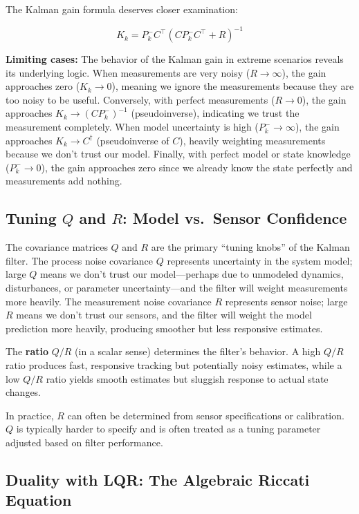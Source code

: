 The Kalman gain formula deserves closer examination:

\begin{equation}
K_k = P_k^- C^\top (CP_k^-C^\top + R)^{-1}
\end{equation}

\textbf{Limiting cases:} The behavior of the Kalman gain in extreme scenarios reveals its underlying logic. When measurements are very noisy ($R \to \infty$), the gain approaches zero ($K_k \to 0$), meaning we ignore the measurements because they are too noisy to be useful. Conversely, with perfect measurements ($R \to 0$), the gain approaches $K_k \to (CP_k^-)^{-1}$ (pseudoinverse), indicating we trust the measurement completely. When model uncertainty is high ($P_k^- \to \infty$), the gain approaches $K_k \to C^\dagger$ (pseudoinverse of $C$), heavily weighting measurements because we don't trust our model. Finally, with perfect model or state knowledge ($P_k^- \to 0$), the gain approaches zero since we already know the state perfectly and measurements add nothing.

\subsection{Tuning $Q$ and $R$: Model vs.\ Sensor Confidence}

The covariance matrices $Q$ and $R$ are the primary ``tuning knobs'' of the Kalman filter. The process noise covariance $Q$ represents uncertainty in the system model; large $Q$ means we don't trust our model---perhaps due to unmodeled dynamics, disturbances, or parameter uncertainty---and the filter will weight measurements more heavily. The measurement noise covariance $R$ represents sensor noise; large $R$ means we don't trust our sensors, and the filter will weight the model prediction more heavily, producing smoother but less responsive estimates.

The \textbf{ratio} $Q/R$ (in a scalar sense) determines the filter's behavior. A high $Q/R$ ratio produces fast, responsive tracking but potentially noisy estimates, while a low $Q/R$ ratio yields smooth estimates but sluggish response to actual state changes.

In practice, $R$ can often be determined from sensor specifications or calibration. $Q$ is typically harder to specify and is often treated as a tuning parameter adjusted based on filter performance.

\subsection{Duality with LQR: The Algebraic Riccati Equation}

